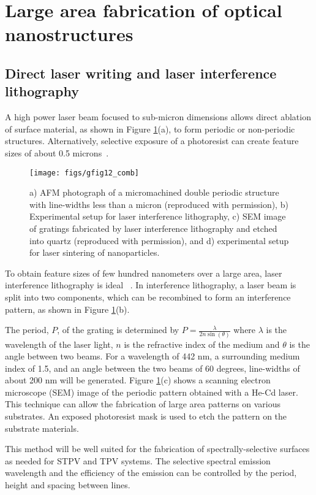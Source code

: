 \documentclass[10pt,letterpaper]{article}
\begin{document}
{\section{Large area fabrication of optical nanostructures}
\subsection{Direct laser writing and laser interference lithography}
A high power laser beam focused to sub-micron dimensions allows direct 
ablation of surface material,  as shown in Figure \ref{gfig12_comb}(a), to form periodic or non-periodic structures.   Alternatively, selective exposure of a 
photoresist can create feature sizes of about 0.5 microns~\cite{g29}. 

\begin{figure}[h]
	\texttt{[image: figs/gfig12\_comb]}
	\caption{\label{gfig12_comb} a) AFM photograph of a micromachined double periodic structure with line-widths less than a micron \cite{g29} (reproduced with permission), b) Experimental setup for laser interference lithography, c) SEM image of gratings fabricated by laser interference lithography and etched into quartz \cite{g30} (reproduced with permission), and d) experimental setup for laser sintering of nanoparticles.} %
\end{figure}

To obtain feature sizes of few hundred nanometers over a large area, laser interference lithography is ideal ~\cite{g30}. In interference lithography, a laser beam is split into two components, which can be recombined to form an interference pattern,  as shown in Figure \ref{gfig12_comb}(b). 

The period, $P$,  of the grating is determined by $P =\frac{\lambda}{2n\sin(\theta)}$ where  $\lambda$ is the wavelength of the laser light, $n$ is the refractive index of the medium and $\theta$ is the angle between two beams. For a wavelength of 442 nm, a surrounding medium index of 1.5, and an angle between the two beams of 60 degrees, line-widths of about 200 nm will be generated.  
Figure \ref{gfig12_comb}(c) shows a scanning electron microscope (SEM) image of the periodic pattern obtained with a He-Cd laser. This technique can allow the fabrication of large area patterns on various substrates. An exposed photoresist mask is used to etch the pattern on the substrate materials. 

This method will be well suited for the fabrication of spectrally-selective surfaces as 
needed for STPV and TPV systems.  The selective spectral emission wavelength and the 
efficiency of the emission can be controlled by the period, height and spacing between lines.

}
\end{document}
